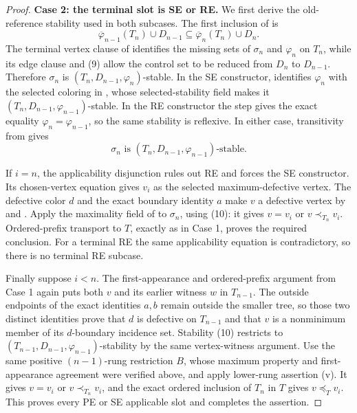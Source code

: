 \begin{proof}
\textbf{Case 2: the terminal slot is SE or RE.}
We first derive the old-reference stability used in both subcases. The
first inclusion of  is
\[
 \overline\varphi_{n-1}(T_n)\cup D_{n-1}
       \subseteq \overline\varphi_n(T_n)\cup D_n.              \tag{9}
\]
The terminal vertex clause of  identifies the
missing sets of \(\sigma_n\) and \(\varphi_n\) on \(T_n\), while its edge
clause and (9) allow the control set to be reduced from \(D_n\) to
\(D_{n-1}\). Therefore \(\sigma_n\) is
\((T_n,D_{n-1},\varphi_n)\)-stable. In the SE constructor,
 identifies \(\varphi_n\) with the selected
coloring in , whose selected-stability
field makes it \((T_n,D_{n-1},\varphi_{n-1})\)-stable. In the RE
constructor the step gives the exact equality
\(\varphi_n=\varphi_{n-1}\), so the same stability is reflexive. In
either case, transitivity from  gives
\[
       \sigma_n\text{ is }
       (T_n,D_{n-1},\varphi_{n-1})\text{-stable}.               \tag{10}
\]

If \(i=n\), the applicability disjunction rules out RE and forces the SE
constructor. Its chosen-vertex equation gives \(v_i\) as the selected
maximum-defective vertex. The defective color \(d\) and the exact
boundary identity \(a\) make \(v\) a defective vertex by
 and . Apply the
maximality field of  to \(\sigma_n\),
using (10): it gives \(v=v_i\) or \(v\prec_{T_n}v_i\). Ordered-prefix
transport to \(T\), exactly as in Case 1, proves the required conclusion.
For a terminal RE the same applicability equation is contradictory, so
there is no terminal RE subcase.

Finally suppose \(i<n\). The first-appearance and ordered-prefix argument
from Case 1 again puts both \(v\) and its earlier witness \(w\) in
\(T_{n-1}\). The outside endpoints of the exact identities \(a,b\)
remain outside the smaller tree, so those two distinct identities prove
that \(d\) is defective on \(T_{n-1}\) and that \(v\) is a nonminimum
member of its \(d\)-boundary incidence set. Stability (10) restricts to
\((T_{n-1},D_{n-1},\varphi_{n-1})\)-stability by the same vertex-witness
argument. Use the same positive \((n-1)\)-rung restriction \(B\), whose
maximum property and first-appearance agreement were verified above, and
apply lower-rung assertion (v). It gives
\(v=v_i\) or \(v\prec_{T_n}v_i\), and the exact ordered inclusion of
\(T_n\) in \(T\) gives \(v\preceq_Tv_i\). This proves every PE or SE
applicable slot and completes the assertion.
\end{proof}
